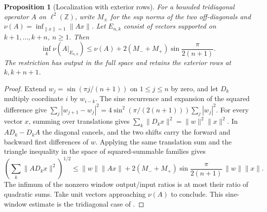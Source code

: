 \documentclass[11pt,reqno]{amsart}
\newtheorem{proposition}[theorem]{Proposition}
\theoremstyle{definition}
\theoremstyle{remark}
\numberwithin{equation}{section}
\newcommand{\Z}{\mathbb{Z}}
\begin{document}
\begin{proposition}[Localization with exterior rows]\label{m9:localization}
For a bounded tridiagonal operator \(A\) on \(\ell^2(\Z)\),
write \(M_\pm\) for the sup norms of the two off-diagonals and
\(\nu(A)=\inf_{\|x\|=1}\|Ax\|\). Let \(E_{n,k}\) consist
of vectors supported on \(k+1,\ldots,k+n\), \(n\ge1\). Then
\[
 \inf_k\nu(A|_{E_{n,k}})\le
 \nu(A)+2(M_-+M_+)\sin\frac{\pi}{2(n+1)}.
\]
The restriction has output in the full space and retains
the exterior rows at \(k,k+n+1\).
\end{proposition}
\begin{proof}
Extend \(w_j=\sin(\pi j/(n+1))\) on \(1\le j\le n\) by zero,
and let \(D_k\) multiply coordinate \(i\) by \(w_{i-k}\).
The sine recurrence and expansion of the squared difference
give \(\sum_j|w_{j+1}-w_j|^2
=4\sin^2(\pi/(2(n+1)))\sum_j|w_j|^2\).
For every vector \(x\), summing over translations gives
\(\sum_k\|D_k x\|^2=\|w\|^2\|x\|^2\).
In \(AD_k-D_k A\) the diagonal cancels, and the two shifts
carry the forward and backward first differences of \(w\).
Applying the same translation sum and the triangle inequality
in the space of squared-summable families gives
\[
 \left(\sum_k\|AD_k x\|^2\right)^{1/2}
 \le\|w\|\|Ax\|
   +2(M_-+M_+)\sin\frac{\pi}{2(n+1)}\,\|w\|\|x\|.
\]
The infimum of the nonzero window output/input ratios is
at most their ratio of quadratic sums. Take unit vectors
approaching \(\nu(A)\) to conclude. This sine-window
estimate is the tridiagonal case of \cite[\S5.1]{m9:CWL}.
\end{proof}
\end{document}
